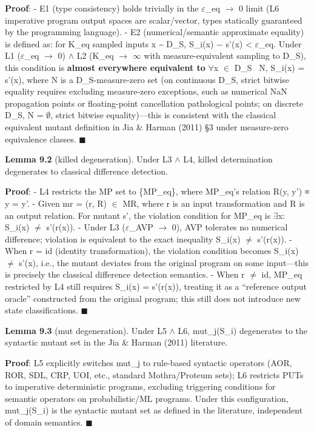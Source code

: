 \documentclass[review,12pt,authoryear]{elsarticle}
\begin{document}
\textbf{Proof}: - E1 (type consistency) holds trivially in the $\varepsilon$\_eq $\to$ 0
limit (L6 imperative program output spaces are scalar/vector, types
statically guaranteed by the programming language). - E2
(numerical/semantic approximate equality) is defined as: for K\_eq
sampled inputs x \textasciitilde{} D\_S, \textbar S\_i(x) −
s'(x)\textbar{} \textless{} $\varepsilon$\_eq. Under L1 ($\varepsilon$\_eq $\to$ 0) $\wedge$ L2 (K\_eq $\to$ $\infty$
with measure-equivalent sampling to D\_S), this condition is
\textbf{almost everywhere equivalent to} $\forall$x $\in$ D\_S ~N, S\_i(x) = s'(x),
where N is a D\_S-measure-zero set (on continuous D\_S, strict bitwise
equality requires excluding measure-zero exceptions, such as numerical
NaN propagation points or floating-point cancellation pathological
points; on discrete D\_S, N = $\emptyset$, strict bitwise equality)---this is
consistent with the classical equivalent mutant definition in Jia \&
Harman (2011) §3 under measure-zero equivalence classes. $\blacksquare$

\textbf{Lemma 9.2} (killed degeneration). Under L3 $\wedge$ L4, killed
determination degenerates to classical difference detection.

\textbf{Proof}: - L4 restricts the MP set to \{MP\_eq\}, where MP\_eq's
relation R(y, y') ≡ y = y'. - Given mr = (r, R) $\in$ MR, where r is an
input transformation and R is an output relation. For mutant s', the
violation condition for MP\_eq is $\exists$x: S\_i(x) $\neq$ s'(r(x)). - Under L3
($\varepsilon$\_AVP $\to$ 0), AVP tolerates no numerical difference; violation is
equivalent to the exact inequality S\_i(x) $\neq$ s'(r(x)). - When r = id
(identity transformation), the violation condition becomes S\_i(x) $\neq$
s'(x), i.e., the mutant deviates from the original program on some
input---this is precisely the classical difference detection semantics.
- When r $\neq$ id, MP\_eq restricted by L4 still requires S\_i(x) =
s'(r(x)), treating it as a ``reference output oracle'' constructed from
the original program; this still does not introduce new state
classifications. $\blacksquare$

\textbf{Lemma 9.3} (mut degeneration). Under L5 $\wedge$ L6, mut\_j(S\_i)
degenerates to the syntactic mutant set in the Jia \& Harman (2011)
literature.

\textbf{Proof}: L5 explicitly switches mut\_j to rule-based syntactic
operators (AOR, ROR, SDL, CRP, UOI, etc., standard Mothra/Proteum sets);
L6 restricts PUTs to imperative deterministic programs, excluding
triggering conditions for semantic operators on probabilistic/ML
programs. Under this configuration, mut\_j(S\_i) is the syntactic mutant
set as defined in the literature, independent of domain semantics. $\blacksquare$
\end{document}

